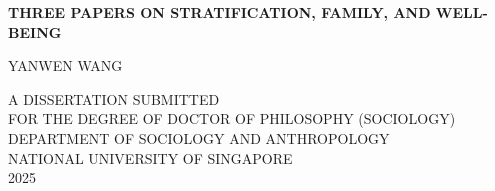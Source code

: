 \begin{titlepage}
    \begin{center}
        \vspace*{2cm}

        \Large
        {\bf THREE PAPERS ON STRATIFICATION, FAMILY, AND WELL-BEING}

        \vspace{4cm}

        \large
        YANWEN WANG

        \vfill

        \normalsize
        A DISSERTATION SUBMITTED\\[0.3cm]
        FOR THE DEGREE OF DOCTOR OF PHILOSOPHY (SOCIOLOGY)\\
        DEPARTMENT OF SOCIOLOGY AND ANTHROPOLOGY\\
        NATIONAL UNIVERSITY OF SINGAPORE\\[2cm]

        2025

    \end{center}
\end{titlepage}